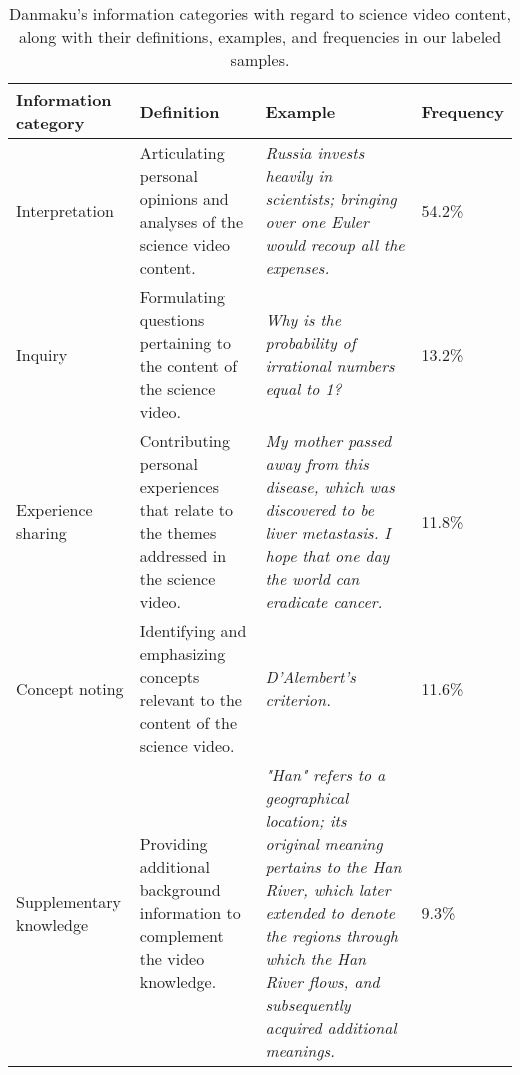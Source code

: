 \begin{table*}[h!]
\centering
\begin{tabular}{p{3.4cm} p{4cm} p{5cm} p{1.2cm}}
\hline
Information category     & Definition                                                                                                         & Example         & Frequency                                                                                                                                                                                                       \\
\hline
Interpretation          & Articulating personal opinions and analyses of the science video content.                   & \textit{Russia invests heavily in scientists; bringing over one Euler would recoup all the expenses.}      & 54.2\%                                                                                                                    \\\hline
Inquiry                 & Formulating questions pertaining to the content of the science video.                       & \textit{Why is the probability of irrational numbers equal to 1?}    & 13.2\%                                                                                                                                                           \\\hline
Experience sharing      & Contributing personal experiences that relate to the themes addressed in the science video. & \textit{My mother passed away from this disease, which was discovered to be liver metastasis. I hope that one day the world can eradicate cancer.}     & 11.8\%                                                                         \\\hline
Concept noting          & Identifying and emphasizing concepts relevant to the content of the science video.          & \textit{D'Alembert's criterion.}          & 11.6\%                                                                                                                                                                                      \\\hline
Supplementary knowledge & Providing additional background information to complement the video knowledge.              & \textit{"Han" refers to a geographical location; its original meaning pertains to the Han River, which later extended to denote the regions through which the Han River flows, and subsequently acquired additional meanings.}  & 9.3\%
\\
\hline
\end{tabular}
\caption{Danmaku's information categories with regard to science video content, along with their definitions, examples, and frequencies in our labeled samples.}
\label{information-theme}
\end{table*}


